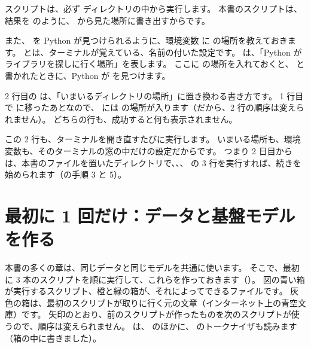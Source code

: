 スクリプトは、必ず  ディレクトリの中から実行します。
本書のスクリプトは、結果を  のように、 から見た場所に書き出すからです。

また、 を Python が見つけられるように、環境変数  に  の場所を教えておきます。
とは、ターミナルが覚えている、名前の付いた設定です。
 は、「Python がライブラリを探しに行く場所」を表します。
ここに  の場所を入れておくと、 と書かれたときに、Python が  を見つけます。


2 行目の  は、「いまいるディレクトリの場所」に置き換わる書き方です。
1 行目で  に移ったあとなので、 には  の場所が入ります（だから、2 行の順序は変えられません）。
どちらの行も、成功すると何も表示されません。

この 2 行も、ターミナルを開き直すたびに実行します。
いまいる場所も、環境変数も、そのターミナルの窓の中だけの設定だからです。
つまり 2 日目からは、本書のファイルを置いたディレクトリで、、、 の 3 行を実行すれば、続きを始められます（の手順 3 と 5）。

\section{最初に 1 回だけ：データと基盤モデルを作る}\label{sec:setup-first}

本書の多くの章は、同じデータと同じモデルを共通に使います。
そこで、最初に 3 本のスクリプトを順に実行して、これらを作っておきます（）。
図の青い箱が実行するスクリプト、橙と緑の箱が、それによってできるファイルです。
灰色の箱は、最初のスクリプトが取りに行く元の文章（インターネット上の青空文庫）です。
矢印のとおり、前のスクリプトが作ったものを次のスクリプトが使うので、順序は変えられません。
 は、 のほかに、 のトークナイザも読みます（箱の中に書きました）。

